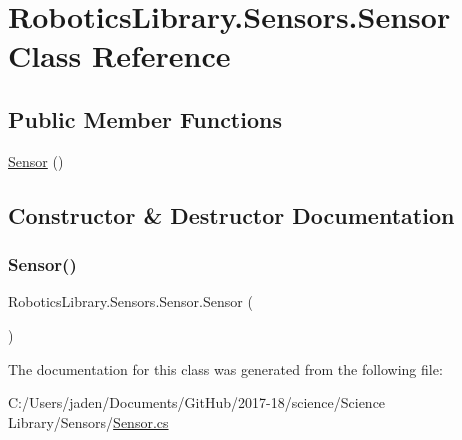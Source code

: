 \hypertarget{class_robotics_library_1_1_sensors_1_1_sensor}{}\section{Robotics\+Library.\+Sensors.\+Sensor Class Reference}
\label{class_robotics_library_1_1_sensors_1_1_sensor}
\subsection*{Public Member Functions}
\begin{DoxyCompactItemize}
\item 
\hyperlink{class_robotics_library_1_1_sensors_1_1_sensor_a9b515c2d60b74b55f7b9530073596a32}{Sensor} ()
\end{DoxyCompactItemize}


\subsection{Constructor \& Destructor Documentation}
\mbox{\label{class_robotics_library_1_1_sensors_1_1_sensor_a9b515c2d60b74b55f7b9530073596a32}} 
\subsubsection{\texorpdfstring{Sensor()}{Sensor()}}
{\footnotesize\ttfamily Robotics\+Library.\+Sensors.\+Sensor.\+Sensor (\begin{DoxyParamCaption}{ }\end{DoxyParamCaption})}



The documentation for this class was generated from the following file\+:\begin{DoxyCompactItemize}
\item 
C\+:/\+Users/jaden/\+Documents/\+Git\+Hub/2017-\/18/science/\+Science Library/\+Sensors/\hyperlink{_sensor_8cs}{Sensor.\+cs}\end{DoxyCompactItemize}
